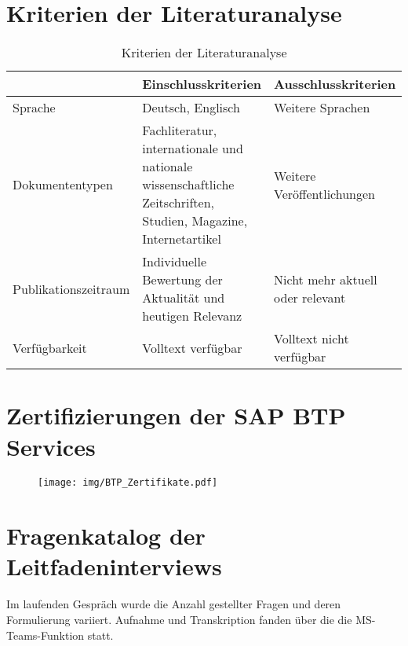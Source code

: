 \section{Kriterien der Literaturanalyse}
\begin{table}[ht]
    \begin{center}
    \begin{tabular}{|p{}|p{}|p{}|}
        \hline  & Einschlusskriterien & Ausschlusskriterien \\[0.5ex]
        \hline Sprache & Deutsch, Englisch & Weitere Sprachen\\
        \hline Dokumententypen & Fachliteratur, internationale und nationale wissenschaftliche Zeitschriften, Studien, Magazine, Internetartikel & Weitere Veröffentlichungen\\
        \hline Publikationszeitraum & Individuelle Bewertung der Aktualität und heutigen Relevanz & Nicht mehr aktuell oder relevant\\
        \hline Verfügbarkeit & Volltext verfügbar & Volltext nicht verfügbar\\
        \hline
    \end{tabular}
    \end{center}
    \caption{Kriterien der Literaturanalyse}
    \label{tab:kriterien}
\end{table}   
\newpage

\section{Zertifizierungen der SAP BTP Services}
\label{sec:BTPZertifikate}
\begin{figure}[h]
    \centering
    \texttt{[image: img/BTP\_Zertifikate.pdf]}
    \label{fig:BTPZertifikate}
  \end{figure}
\newpage

\section{Fragenkatalog der Leitfadeninterviews}
\label{sec:Fragenkatalog}
Im laufenden Gespräch wurde die Anzahl gestellter Fragen und deren Formulierung variiert. Aufnahme und Transkription fanden über die die MS-Teams-Funktion statt.

